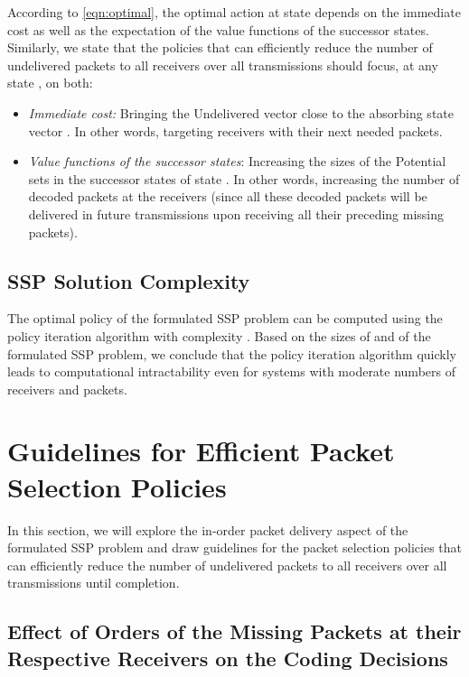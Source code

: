 \documentclass[12pt, peerreview, onecolumn]{IEEEtran}
\begin{document}
According to \eqref{eqn:optimal}, the optimal action at state   depends on the immediate cost as well as the expectation of the value functions of the successor states. Similarly, we  state that the policies that can  efficiently reduce the  number of  undelivered packets to all receivers over all transmissions  should focus, at any  state , on both:
\begin{itemize}
\item  \emph{Immediate cost:} Bringing the  Undelivered vector  close to the absorbing state vector . In other words, targeting receivers with their next needed packets.
\item  \emph{Value functions of the successor states}: Increasing the sizes of the Potential sets  in the  successor states  of state . In other words, increasing the number of  decoded packets at the receivers (since all these decoded packets will be delivered in  future transmissions upon receiving all their preceding missing packets).
\end{itemize}
\vspace{-5mm}
\subsection{SSP Solution Complexity} \label{complexity}
The optimal policy of the formulated SSP problem can be computed using the policy iteration algorithm with  complexity   \cite{puterman2009markov}.  Based on the sizes of    and    of the formulated  SSP problem,  we conclude that the policy iteration algorithm quickly leads to computational intractability even for systems with moderate numbers of  receivers  and packets.

\vspace{-5mm}
\section{Guidelines for  Efficient Packet Selection Policies}\label{guidelines}
In this section,  we will  explore  the  in-order packet delivery aspect of the formulated  SSP problem and  draw  guidelines for the packet selection policies that can efficiently reduce the number of undelivered packets to all receivers over all transmissions until completion.
\vspace{-5mm}
\subsection{Effect of  Orders of the Missing  Packets at their Respective Receivers on the Coding Decisions} \label{sec:packet}
\end{document}

